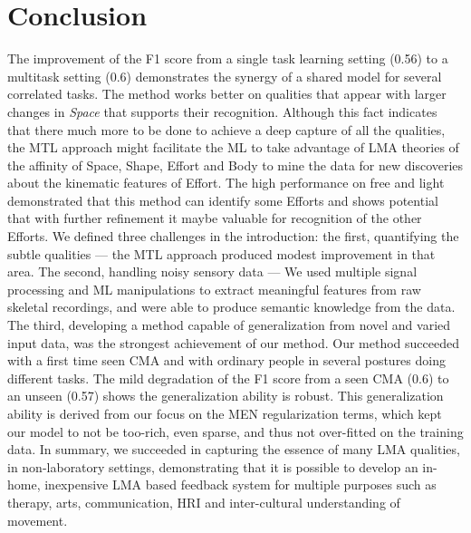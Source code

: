 \documentclass{sigchi}
\begin{document}
\section{Conclusion}

The improvement of the F1 score from a single task learning setting (0.56) to a multitask setting (0.6) demonstrates the synergy of a shared model for several correlated tasks. 
The method works better on qualities that appear with larger changes in \textit{Space} that supports their recognition. 
Although this fact indicates that there much more to be done to achieve a
deep capture of all the qualities, the MTL approach might facilitate the ML to
take advantage of LMA theories of the affinity of Space, Shape, Effort and Body
to mine the data for new discoveries about the kinematic features of Effort.
The high performance on free and light demonstrated that this method can identify some Efforts and shows potential that with further refinement it maybe valuable for recognition of the other Efforts. 
We defined  three challenges in the introduction: the first, quantifying the subtle qualities --- 
the MTL approach produced modest improvement in that area.
The second, handling noisy sensory data --- We used multiple signal processing and ML manipulations to extract meaningful features from raw skeletal recordings, and were able to produce semantic knowledge from the data. 
The third, developing a method capable  of generalization from novel and varied input data, was the strongest achievement of our method. Our method succeeded with a first time seen CMA and with ordinary people in several postures doing different tasks. 
The mild degradation of the F1 score from a seen CMA (0.6) to an unseen (0.57) shows the generalization ability is robust.
This generalization ability is derived from our focus on the MEN regularization terms, which kept our model to not be too-rich, even sparse, and thus not over-fitted on the training data.
In summary, we succeeded in capturing the essence of many LMA qualities, in non-laboratory settings, demonstrating that it is possible to develop an in-home, inexpensive LMA based feedback system for multiple purposes such as therapy, arts, communication, HRI and inter-cultural understanding of movement.


\end{document}
